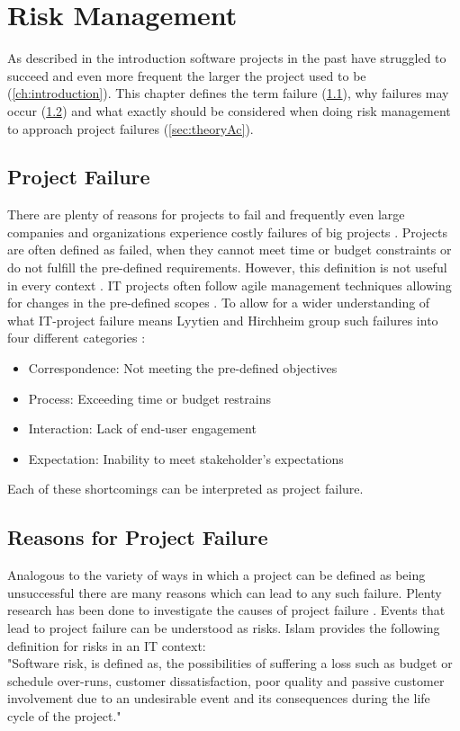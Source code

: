 \section{Risk Management}
\label{sec:theoryA}

As described in the introduction software projects in the past have struggled to succeed and even more frequent the larger the project used to be (\ref{ch:introduction}). This chapter defines the term failure (\ref{sec:theorAa}), why failures may occur (\ref{sec:theorAb}) and what exactly should be considered when doing risk management to approach project failures (\ref{sec:theoryAc}).

\subsection{Project Failure}
\label{sec:theorAa}
There are plenty of reasons for projects to fail and frequently even large companies and organizations experience costly failures of big projects \cite{dwivediResearchInformationSystems2015}. Projects are often defined as failed, when they cannot meet time or budget constraints or do not fulfill the pre-defined requirements. However, this definition is not useful in every context \cite{debakkerDoesRiskManagement2010}. IT projects often follow agile management techniques allowing for changes in the pre-defined scopes \cite{kusay-merkleAgilesProjektmanagementIm2018}. To allow for a wider understanding of what IT-project failure means Lyytien and Hirchheim group such failures into four different categories \cite{lyytinenInformationSystemsFailures1988}: 
\begin{itemize}
	\item Correspondence: Not meeting the pre-defined objectives
	\item Process: Exceeding time or budget restrains
	\item Interaction: Lack of end-user engagement
	\item Expectation: Inability to meet stakeholder's expectations
\end{itemize}
Each of these shortcomings can be interpreted as project failure.

\subsection{Reasons for Project Failure}
\label{sec:theorAb}	
Analogous to the variety of ways in which a project can be defined as being unsuccessful there are many reasons which can lead to any such failure. Plenty research has been done to investigate the causes of project failure \cite{guptaSystematicLiteratureReview2018}.  Events that lead to project failure can be understood as risks. Islam \cite{islamSoftwareDevelopmentRisk2011} provides the following definition for risks in an IT context:\\
"Software risk, is defined as, the possibilities of suffering a loss such as budget or schedule over-runs, customer dissatisfaction, poor quality and passive customer involvement due to an undesirable event and its consequences during the life cycle of the project."

